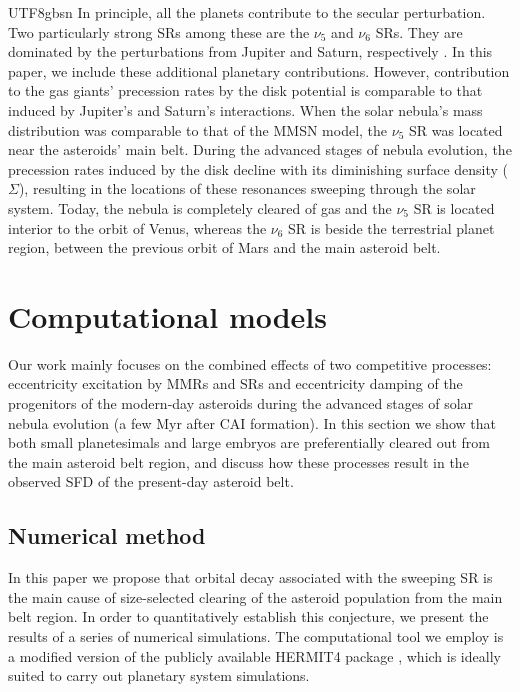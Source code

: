 \documentclass[tighten]{aastex6}
\begin{document}
\begin{CJK*}{UTF8}{gbsn}
In principle, all the planets contribute to the secular perturbation. 
Two particularly strong SRs among these are the $\nu_5$ 
and $\nu_6$ SRs.  They are dominated by the perturbations from 
Jupiter and Saturn, respectively \citep{agnorlin2012}. In this paper,
we include these additional planetary contributions.  However, 
contribution to the gas giants' precession rates by the disk potential 
is comparable to that induced by Jupiter's and Saturn's interactions.
When the solar nebula's mass distribution was comparable to that of the 
MMSN model, the $\nu_5$ SR was 
located near the asteroids' main belt. During the advanced stages of nebula 
evolution, the precession rates induced by the disk decline with its 
diminishing surface density ($\Sigma$), resulting in the locations of 
these resonances sweeping through the solar system.  
Today, the nebula is completely cleared of gas and the $\nu_5$ SR is located interior to the 
orbit of Venus, whereas the $\nu_6$ SR is beside the terrestrial 
planet region, between the previous orbit of Mars and the main asteroid belt. 





\section{Computational models}
\label{sec:computation}

Our work mainly focuses on the combined 
effects of two competitive processes: eccentricity excitation by 
MMRs and SRs and eccentricity damping of the progenitors of 
the modern-day asteroids during the advanced stages of solar 
nebula evolution (a few Myr after CAI formation). In this 
section we show that both small planetesimals and large embryos are 
preferentially cleared out from the main asteroid belt region, and discuss
how these processes result in the observed SFD of the present-day asteroid belt.

\subsection{Numerical method}
\label{sec:nmethod}

In this paper we propose that orbital decay associated with
the sweeping SR is the main cause of size-selected 
clearing of the asteroid population from the main belt region.  
In order to quantitatively establish this conjecture, we present 
the results of a series of numerical simulations. The computational 
tool we employ is a modified version of the publicly available HERMIT4 package  \citep{aarseth2003}, which is ideally suited to carry out planetary system simulations.


\end{CJK*}
\end{document}
